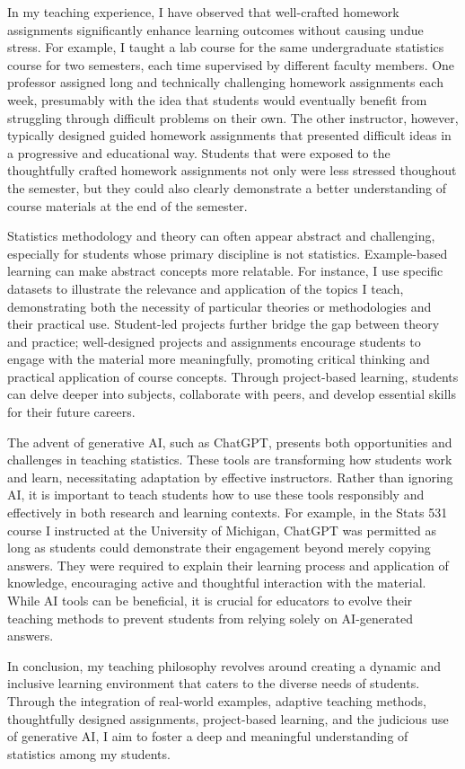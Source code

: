 \documentclass{article}
\begin{document}
In my teaching experience, I have observed that well-crafted homework assignments significantly enhance learning outcomes without causing undue stress.
For example, I taught a lab course for the same undergraduate statistics course for two semesters, each time supervised by different faculty members.
One professor assigned long and technically challenging homework assignments each week, presumably with the idea that students would eventually benefit from struggling through difficult problems on their own.
The other instructor, however, typically designed guided homework assignments that presented difficult ideas in a progressive and educational way.
Students that were exposed to the thoughtfully crafted homework assignments not only were less stressed thoughout the semester, but they could also clearly demonstrate a better understanding of course materials at the end of the semester.

Statistics methodology and theory can often appear abstract and challenging, especially for students whose primary discipline is not statistics.
Example-based learning can make abstract concepts more relatable.
For instance, I use specific datasets to illustrate the relevance and application of the topics I teach, demonstrating both the necessity of particular theories or methodologies and their practical use.
Student-led projects further bridge the gap between theory and practice; well-designed projects and assignments encourage students to engage with the material more meaningfully, promoting critical thinking and practical application of course concepts.
Through project-based learning, students can delve deeper into subjects, collaborate with peers, and develop essential skills for their future careers.

The advent of generative AI, such as ChatGPT, presents both opportunities and challenges in teaching statistics.
These tools are transforming how students work and learn, necessitating adaptation by effective instructors.
Rather than ignoring AI, it is important to teach students how to use these tools responsibly and effectively in both research and learning contexts.
For example, in the Stats 531 course I instructed at the University of Michigan, ChatGPT was permitted as long as students could demonstrate their engagement beyond merely copying answers.
They were required to explain their learning process and application of knowledge, encouraging active and thoughtful interaction with the material.
While AI tools can be beneficial, it is crucial for educators to evolve their teaching methods to prevent students from relying solely on AI-generated answers.

In conclusion, my teaching philosophy revolves around creating a dynamic and inclusive learning environment that caters to the diverse needs of students.
Through the integration of real-world examples, adaptive teaching methods, thoughtfully designed assignments, project-based learning, and the judicious use of generative AI, I aim to foster a deep and meaningful understanding of statistics among my students.



\end{document}

